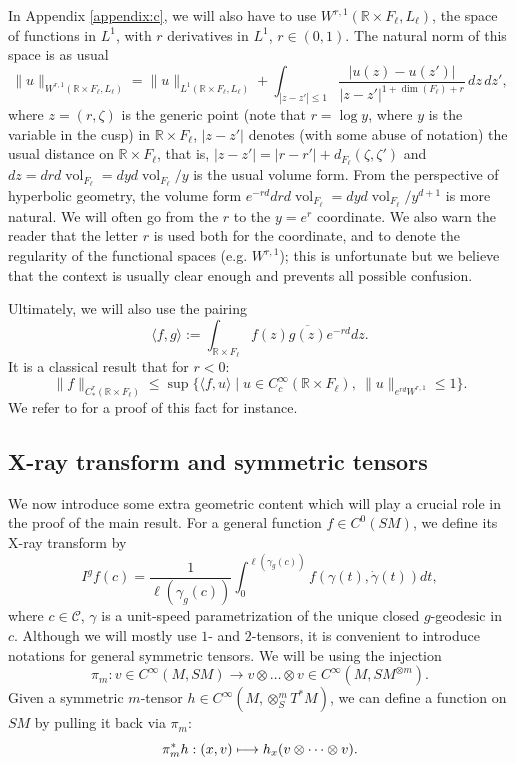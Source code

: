 \documentclass[10pt]{amsart}
\newcommand\mto{\mathchoice{\longmapsto}{\mapsto}{\mapsto}{\mapsto}}
\newcommand{\R}{\mathbb{R}}
\newcommand{\mc}{\mathcal}
\DeclareMathOperator{\vol}{\mathrm{vol}}
\theoremstyle{plain}
\theoremstyle{definition}
\begin{document}
In Appendix \ref{appendix:c}, we will also have to use $W^{r,1}(\R\times F_\ell,L_\ell)$, the space of functions in $L^1$, with $r$ derivatives in $L^1$, $r\in(0,1)$. The natural norm of this space is as usual
\begin{equation}\label{eq:norm-W^1,r}
\|u\|_{W^{r,1}(\R\times F_\ell,L_\ell)} = \|u\|_{L^1(\R\times F_\ell,L_\ell)} + \int_{|z-z'|\leq 1} \frac{|u(z)-u(z')|}{|z-z'|^{1+\dim(F_\ell)+r}} \,dz \,dz',
\end{equation}
where $z=(r,\zeta)$ is the generic point {\color{black}(note that $r=\log y$, where $y$ is the variable in the cusp)} in $\R\times F_\ell$, $|z-z'|$ denotes (with some abuse of notation) the usual distance on $\R\times F_\ell$, that is, $|z-z'| = |r-r'| + d_{F_\ell}(\zeta,\zeta')$ and $dz= dr d\vol_{F_\ell}=dy d\vol_{F_\ell}/y$ is the usual volume form. From the perspective of hyperbolic geometry, the volume form $e^{-rd} dr d\vol_{F_\ell} = dy d\vol_{F_\ell}/y^{d+1}$ is more natural. We will often go from the $r$ to the $y=e^r$ coordinate. {\color{black}We also warn the reader that the letter $r$ is used both for the coordinate, and to denote the regularity of the functional spaces (e.g. $W^{r,1}$); this is unfortunate but we believe that the context is usually clear enough and prevents all possible confusion.}

Ultimately, we will also use the pairing
\[
\langle f, g\rangle := \int_{\R\times F_\ell} f(z)\overline{g(z)}e^{-rd}dz.
\]
It is a classical result that for $r<0$:
\begin{equation}\label{eq:duality-C-s}
\|f \|_{C_\ast^r(\R\times F_\ell)} \leq \sup \{ \langle f, u\rangle\mid u\in C^\infty_c(\R\times F_\ell),\ \|u\|_{e^{rd} W^{r,1}}\leq 1 \}.
\end{equation}
We refer to \cite[Prop.\,2.76]{Bahouri-Chemin-Danchin-2011} for a proof of this fact for instance.

\subsection{X-ray transform and symmetric tensors}

\label{sssection:intro-tensors}

We now introduce some extra geometric content which will play a crucial role in the proof of the main result. For a general function $f\in C^0(SM)$, we define its X-ray transform by
\[
I^gf(c) = \frac{1}{\ell(\gamma_g(c))} \int_{0}^{\ell(\gamma_g(c))} f(\gamma(t),\dot{\gamma}(t)) dt,
\]
where $c \in \mc{C}$, $\gamma$ is a unit-speed parametrization of the unique closed $g$-geodesic in $c$. Although we will mostly use $1$- and $2$-tensors, it is convenient to introduce notations for general symmetric tensors. We will be using the injection
\[
\pi_m : v \in C^\infty(M, SM) \to v \otimes \dots \otimes v \in C^\infty(M, SM^{\otimes m}).
\]
Given a symmetric $m$-tensor $h\in C^\infty(M,\otimes^m_S T^\ast M)$, we can define a function on $SM$ by pulling it back via $\pi_m$:
\[
\pi_m^\ast h: (x,v) \mto h_x ( v \otimes \dots \otimes v).
\]
\end{document}
